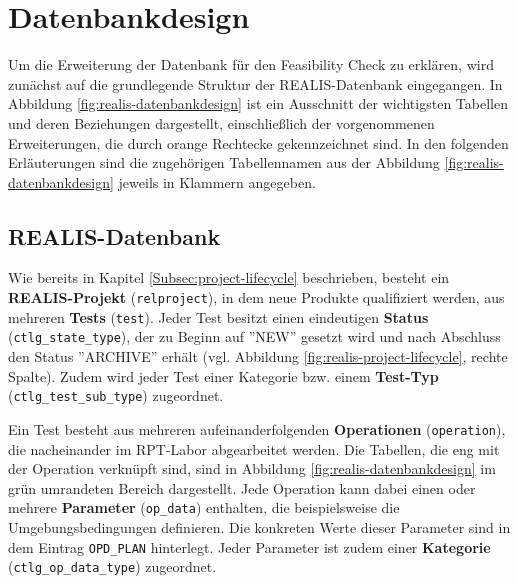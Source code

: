 \section{Datenbankdesign}
Um die Erweiterung der Datenbank für den Feasibility Check zu erklären, wird zunächst auf die grundlegende Struktur der REALIS-Datenbank eingegangen. In Abbildung \ref{fig:realis-datenbankdesign} ist ein Ausschnitt der wichtigsten Tabellen und deren Beziehungen dargestellt, einschließlich der vorgenommenen Erweiterungen, die durch orange Rechtecke gekennzeichnet sind. In den folgenden Erläuterungen sind die zugehörigen Tabellennamen aus der Abbildung \ref{fig:realis-datenbankdesign} jeweils in Klammern angegeben.

\subsection{REALIS-Datenbank}

Wie bereits in Kapitel \ref{Subsec:project-lifecycle} beschrieben, besteht ein \textbf{REALIS-Projekt} (\texttt{relproject}), in dem neue Produkte qualifiziert werden, aus mehreren \textbf{Tests} (\texttt{test}). Jeder Test besitzt einen eindeutigen \textbf{Status} (\texttt{ctlg\_state\_type}), der zu Beginn auf ''NEW'' gesetzt wird und nach Abschluss den Status ''ARCHIVE'' erhält (vgl. Abbildung \ref{fig:realis-project-lifecycle}, rechte Spalte). Zudem wird jeder Test einer Kategorie bzw. einem \textbf{Test-Typ} (\texttt{ctlg\_test\-\_sub\_type}) zugeordnet.

Ein Test besteht aus mehreren aufeinanderfolgenden \textbf{Operationen} (\texttt{operation}), die nacheinander im \gls{RPT}-Labor abgearbeitet werden. Die Tabellen, die eng mit der Operation verknüpft sind, sind in Abbildung \ref{fig:realis-datenbankdesign} im grün umrandeten Bereich dargestellt. Jede Operation kann dabei einen oder mehrere \textbf{Parameter} (\texttt{op\_data}) enthalten, die beispielsweise die Umgebungsbedingungen definieren. Die konkreten Werte dieser Parameter sind in dem Eintrag \texttt{OPD\_PLAN} hinterlegt. Jeder Parameter ist zudem einer \textbf{Kategorie} (\texttt{ctlg\_op\_\-data\_type}) zugeordnet.  


